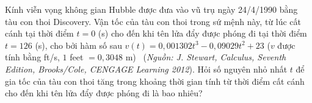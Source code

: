 \begin{ex}%
Kính viễn vọng không gian Hubble được đưa vào vũ trụ ngày 24/4/1990 bằng tàu con thoi Discovery. Vận tốc của tàu con thoi trong sứ mệnh này, từ lúc cất cánh tại thời điểm $t=0$ (s) cho đến khi tên lửa đẩy được phóng đi tại thời điểm $t=126$ (s), cho bởi hàm số sau $v(t)=0{,}001302t^3-0{,}09029t^2+23$ ($v$ được tính bằng ft/s, $1$ feet $=0{,}3048$ m)~ (\textit{Nguồn: J. Stewart, Calculus, Seventh Edition, Brooks/Cole, CENGAGE Learning 2012}).
Hỏi số nguyên nhỏ nhất $t$ để gia tốc của tàu con thoi tăng trong khoảng thời gian tính từ thời điểm cất cánh cho đến khi tên lửa đẩy được phóng đi là bao nhiêu?
\end{ex}
